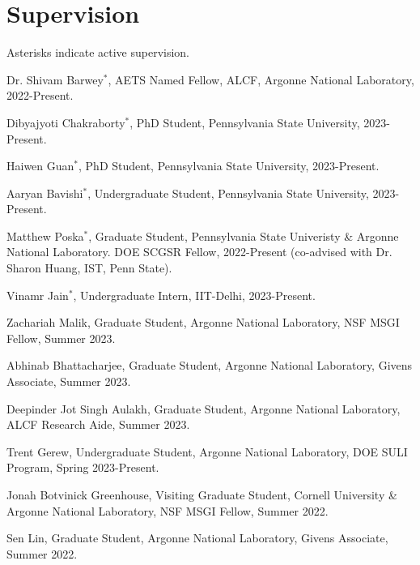 \documentclass[letterpaper]{article}
\renewenvironment{itemize}{
  \begin{list}{}{
    \setlength{\leftmargin}{1.5em}
  }
}{
  \end{list}
}
\begin{document}
\section*{Supervision}

Asterisks indicate active supervision.

\begin{itemize}

  \item Dr. Shivam Barwey$^\ast$, AETS Named Fellow, ALCF, Argonne National Laboratory, 2022-Present.

  \item Dibyajyoti Chakraborty$^\ast$, PhD Student, Pennsylvania State University, 2023-Present.

  \item Haiwen Guan$^\ast$, PhD Student, Pennsylvania State University, 2023-Present.

  \item Aaryan Bavishi$^\ast$, Undergraduate Student, Pennsylvania State University, 2023-Present.

  \item Matthew Poska$^\ast$, Graduate Student, Pennsylvania State Univeristy \& Argonne National Laboratory. DOE SCGSR Fellow, 2022-Present (co-advised with Dr. Sharon Huang, IST, Penn State).

  \item Vinamr Jain$^\ast$, Undergraduate Intern, IIT-Delhi, 2023-Present.

  \item Zachariah Malik, Graduate Student, Argonne National Laboratory, NSF MSGI Fellow, Summer 2023.

  \item Abhinab Bhattacharjee, Graduate Student, Argonne National Laboratory, Givens Associate, Summer 2023.

  \item Deepinder Jot Singh Aulakh, Graduate Student, Argonne National Laboratory, ALCF Research Aide, Summer 2023.

  \item Trent Gerew, Undergraduate Student, Argonne National Laboratory, DOE SULI Program, Spring 2023-Present.

  \item Jonah Botvinick Greenhouse, Visiting Graduate Student, Cornell University \& Argonne National Laboratory, NSF MSGI Fellow, Summer 2022.

  \item Sen Lin, Graduate Student, Argonne National Laboratory, Givens Associate, Summer 2022.


\end{itemize}
\end{document}
